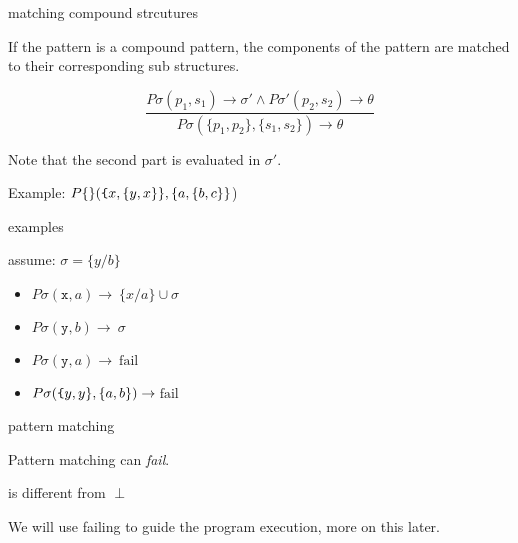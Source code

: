 \begin{frame}{matching compound strcutures}

If the pattern is a compound pattern, \pause the components of the pattern are matched to their corresponding sub structures.

\pause\vspace{10pt}

$$\frac{P\sigma(p_1, s_1) \rightarrow \sigma' \wedge P\sigma'(p_2, s_2) \rightarrow \theta}{P\sigma(\lbrace p_1, p_2 \rbrace  , \lbrace s_1, s_2 \rbrace) \rightarrow \theta}$$


\pause \vspace{10pt}
Note that the second part is evaluated in $\sigma'$. 

\pause \vspace{10pt}Example: $P\{\}({\texttt \{x,\{y,x\}\}}, \{a, \{b,c\}\}$)

\vspace{20pt}{\em Match a compund pattern with anyting but a compound structure will fail.}

\end{frame}

\begin{frame}{examples}

assume: $\sigma = \lbrace y/b\rbrace$

\begin{itemize}
  \pause\item $P\sigma({\texttt x} , a) \rightarrow $\pause $\ \lbrace x/a \rbrace  \cup \sigma$
  \pause\item $P\sigma({\texttt y} , b) \rightarrow $\pause $\ \sigma$
  \pause\item $P\sigma({\texttt y} , a) \rightarrow $\pause  $\ \mathrm{fail}$
  \pause\item $P\sigma({\texttt \{ y, y\}} , \lbrace a, b \rbrace) \rightarrow $\pause $\ \mathrm{fail}$
\end{itemize}

\end{frame}

\begin{frame}{pattern matching}

\pause Pattern matching can {\em fail}. 

\pause\vspace{20pt}{\em fail} is different from $\perp$

We will use failing to guide the program execution, more on this later.

\end{frame}

